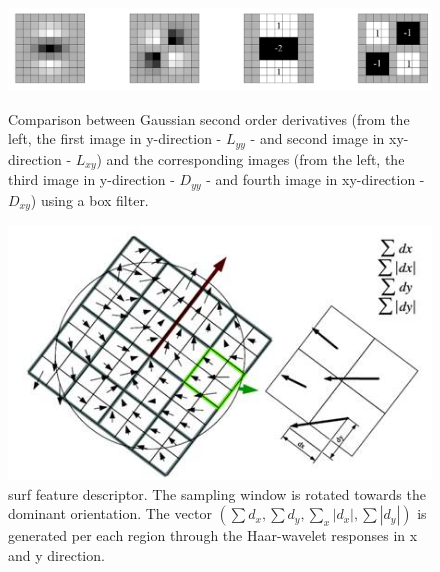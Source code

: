 \begin{figure}[ht]
	\begin{minipage}[b]{0.65\linewidth}
		\centering
		\includegraphics[width=\textwidth]{images/surf.png}
		\caption[Comparison between Gaussian second order derivatives and box filter]{Comparison between Gaussian second order derivatives (from the left, the first image in y-direction - $L_{yy}$ - and second image in xy-direction - $L_{xy}$) and the corresponding images (from the left, the third image in y-direction - $D_{yy}$ - and fourth image in xy-direction - $D_{xy}$) using a box filter. \cite{surf}}
		\label{sec2:fig:surf}
	\end{minipage}
	\hspace{0.5cm}
	\begin{minipage}[b]{0.3\linewidth}
		\centering
		\includegraphics[width=\textwidth]{images/surf2.jpg}
		\caption[\acrshort{surf} feature descriptor]{\acrshort{surf} feature descriptor. The sampling window is rotated towards the dominant orientation. The vector $\left( \sum d _ { x } , \sum d _ { y } , \sum _ { x } \left| d _ { x } \right| , \sum \left| d _ { y } \right| \right)$ is generated per each region through the Haar-wavelet responses in x and y direction. \cite{surf}}
		\label{sec2:fig:surff}
	\end{minipage}
\end{figure}

